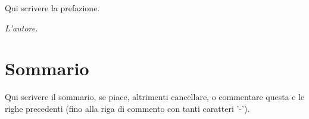 %
% 
\Preface
%
%
Qui scrivere la prefazione. \\
\begin{flushright}
{\emph{L'autore.}}
\end{flushright}



\chapter*{Sommario} 
Qui scrivere il sommario, se piace, altrimenti cancellare, o commentare questa e le righe precedenti (fino alla riga di commento con tanti caratteri '-').\\
